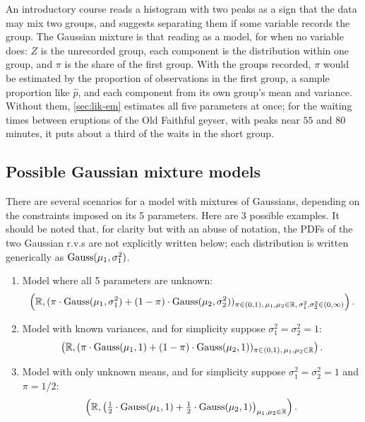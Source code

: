\begin{bridge}
An introductory course reads a histogram with two peaks as a sign that the data may mix two groups, and suggests separating them if some variable records the group.
The Gaussian mixture is that reading as a model, for when no variable does: $Z$ is the unrecorded group, each component is the distribution within one group, and $\pi$ is the share of the first group.
With the groups recorded, $\pi$ would be estimated by the proportion of observations in the first group, a sample proportion like $\hat{p}$, and each component from its own group's mean and variance.
Without them, \cref{sec:lik-em} estimates all five parameters at once; for the waiting times between eruptions of the Old Faithful geyser, with peaks near $55$ and $80$ minutes, it puts about a third of the waits in the short group.
\end{bridge}

\subsection{Possible Gaussian mixture models}

There are several scenarios for a model with mixtures of Gaussians, depending on the constraints imposed on its 5 parameters.
Here are 3 possible examples.
It should be noted that, for clarity but with an abuse of notation, the PDFs of the two Gaussian r.v.s are not explicitly written below; each distribution is written generically as $\text{Gauss}(\mu_1, \sigma_1^2)$.
\begin{enumerate}
\item Model where all 5 parameters are unknown:
\[
\left( \mathbb{R}, (\pi \cdot \text{Gauss}(\mu_1, \sigma_1^2) + (1-\pi) \cdot \text{Gauss}(\mu_2, \sigma_2^2))_{\pi \in (0,1), \, \mu_1, \mu_2 \in \mathbb{R}, \, \sigma_1^2, \sigma_2^2 \in (0,\infty)} \right).
\]
\item Model with known variances, and for simplicity suppose $\sigma_1^2 = \sigma_2^2 = 1$:
\[
\left( \mathbb{R}, (\pi \cdot \text{Gauss}(\mu_1, 1) + (1-\pi) \cdot \text{Gauss}(\mu_2, 1))_{\pi \in (0,1), \, \mu_1, \mu_2 \in \mathbb{R}} \right).
\]
\item Model with only unknown means, and for simplicity suppose $\sigma_1^2 = \sigma_2^2 = 1$ and $\pi = 1/2$:
\[
\left( \mathbb{R}, \left( \tfrac{1}{2} \cdot \text{Gauss}(\mu_1, 1) + \tfrac{1}{2} \cdot \text{Gauss}(\mu_2, 1) \right)_{\mu_1, \mu_2 \in \mathbb{R}} \right).
\]
\end{enumerate}

